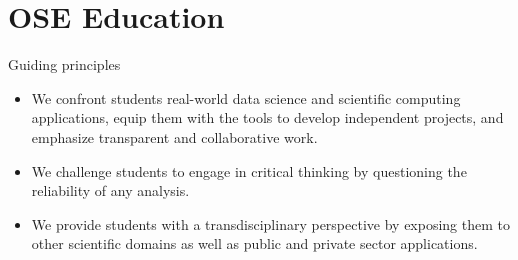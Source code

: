 \section{OSE Education}
\begin{frame}{Guiding principles}\vspace{0.4cm}

	\begin{itemize}\setlength\itemsep{1em}
\item We confront students real-world data science and scientific computing applications, equip them with the tools to develop independent projects, and emphasize transparent and collaborative work.
\item We challenge students to engage in critical thinking by questioning the reliability of any analysis.
\item We provide students with a transdisciplinary perspective by exposing them to other scientific domains as well as public and private sector applications.
\end{itemize}

\end{frame}
